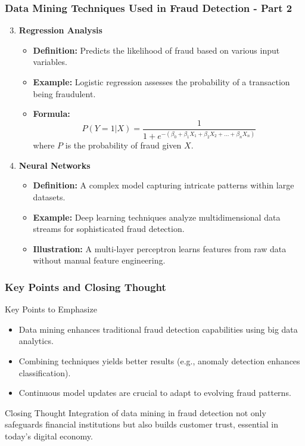 \documentclass[aspectratio=169]{beamer}
\begin{document}
\begin{frame}[fragile]
    \frametitle{Data Mining Techniques Used in Fraud Detection - Part 2}
    \begin{enumerate}
        \setcounter{enumi}{2} %
        \item \textbf{Regression Analysis}
            \begin{itemize}
                \item \textbf{Definition:} Predicts the likelihood of fraud based on various input variables.
                \item \textbf{Example:} Logistic regression assesses the probability of a transaction being fraudulent.
                \item \textbf{Formula:} 
                \begin{equation}
                P(Y=1 | X) = \frac{1}{1 + e^{-(\beta_0 + \beta_1X_1 + \beta_2X_2 + ... + \beta_nX_n)}}
                \end{equation}
                where \( P \) is the probability of fraud given \( X \).
            \end{itemize}
        
        \item \textbf{Neural Networks}
            \begin{itemize}
                \item \textbf{Definition:} A complex model capturing intricate patterns within large datasets.
                \item \textbf{Example:} Deep learning techniques analyze multidimensional data streams for sophisticated fraud detection.
                \item \textbf{Illustration:} A multi-layer perceptron learns features from raw data without manual feature engineering.
            \end{itemize}
    \end{enumerate}
\end{frame}

\begin{frame}[fragile]
    \frametitle{Key Points and Closing Thought}
    \begin{block}{Key Points to Emphasize}
        \begin{itemize}
            \item Data mining enhances traditional fraud detection capabilities using big data analytics.
            \item Combining techniques yields better results (e.g., anomaly detection enhances classification).
            \item Continuous model updates are crucial to adapt to evolving fraud patterns.
        \end{itemize}
    \end{block}
    
    \begin{block}{Closing Thought}
        Integration of data mining in fraud detection not only safeguards financial institutions but also builds customer trust, essential in today’s digital economy.
    \end{block}
\end{frame}
\end{document}
